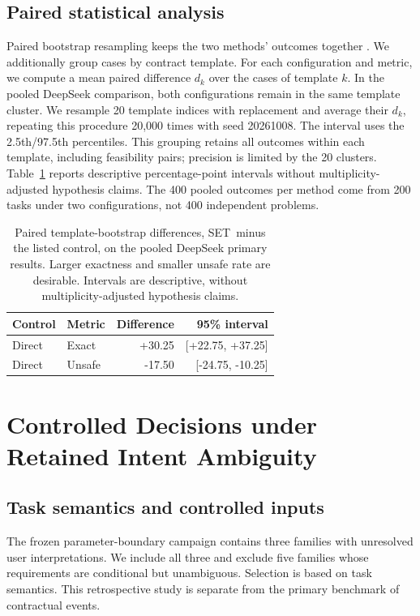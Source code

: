 \documentclass[11pt]{article}
\newcommand{\ours}{\textsc{SET}}
\begin{document}
\subsection{Paired statistical analysis}
Paired bootstrap resampling keeps the two methods' outcomes together \citep{stats}. We additionally group cases by contract template. For each configuration and metric, we compute a mean paired difference $d_k$ over the cases of template $k$. In the pooled DeepSeek comparison, both configurations remain in the same template cluster. We resample 20 template indices with replacement and average their $d_k$, repeating this procedure 20,000 times with seed 20261008. The interval uses the 2.5th/97.5th percentiles. This grouping retains all outcomes within each template, including feasibility pairs; precision is limited by the 20 clusters. Table~\ref{tab:intervals} reports descriptive percentage-point intervals without multiplicity-adjusted hypothesis claims. The 400 pooled outcomes per method come from 200 tasks under two configurations, not 400 independent problems.

\begin{table}[!htbp]
\centering\small
\begin{tabular}{llrr}
\toprule
Control & Metric & Difference & 95\% interval \\
\midrule
Direct & Exact & +30.25 & [+22.75, +37.25] \\
Direct & Unsafe & -17.50 & [-24.75, -10.25] \\
\bottomrule
\end{tabular}
\caption{Paired template-bootstrap differences, \ours\ minus the listed control, on the pooled DeepSeek primary results. Larger exactness and smaller unsafe rate are desirable. Intervals are descriptive, without multiplicity-adjusted hypothesis claims.}
\label{tab:intervals}
\end{table}
\section{Controlled Decisions under Retained Intent Ambiguity}
\label{app:intent}
\subsection{Task semantics and controlled inputs}
The frozen parameter-boundary campaign contains three families with unresolved user interpretations. We include all three and exclude five families whose requirements are conditional but unambiguous. Selection is based on task semantics. This retrospective study is separate from the primary benchmark of contractual events.
\end{document}
